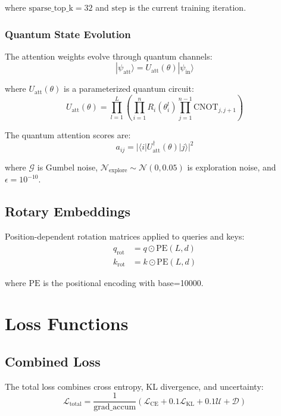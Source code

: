 \documentclass{article}
\begin{document}
where $\text{sparse\_top\_k}=32$ and $\text{step}$ is the current training iteration.

\subsubsection{Quantum State Evolution}
The attention weights evolve through quantum channels:
\begin{equation}
|\psi_{\text{att}}\rangle = U_{\text{att}}(\theta)|\psi_{\text{in}}\rangle
\end{equation}

where $U_{\text{att}}(\theta)$ is a parameterized quantum circuit:
\begin{equation}
U_{\text{att}}(\theta) = \prod_{l=1}^L \left(\prod_{i=1}^n R_i(\theta_i^l) \prod_{j=1}^{n-1} \text{CNOT}_{j,j+1}\right)
\end{equation}

The quantum attention scores are:
\begin{equation}
a_{ij} = |\langle i|U_{\text{att}}^\dagger(\theta)|j\rangle|^2
\end{equation}

where $\mathcal{G}$ is Gumbel noise, $\mathcal{N}_{\text{explore}} \sim \mathcal{N}(0, 0.05)$ is exploration noise, and $\epsilon=10^{-10}$.

\subsection{Rotary Embeddings}
Position-dependent rotation matrices applied to queries and keys:
\begin{equation}
\begin{split}
q_{\text{rot}} &= q \odot \text{PE}(L,d) \\
k_{\text{rot}} &= k \odot \text{PE}(L,d)
\end{split}
\end{equation}

where $\text{PE}$ is the positional encoding with base=10000.

\section{Loss Functions}

\subsection{Combined Loss}
The total loss combines cross entropy, KL divergence, and uncertainty:
\begin{equation}
\mathcal{L}_{\text{total}} = \frac{1}{\text{grad\_accum}}\left(\mathcal{L}_{\text{CE}} + 0.1\mathcal{L}_{\text{KL}} + 0.1\mathcal{U} + \mathcal{D}\right)
\end{equation}
\end{document}
